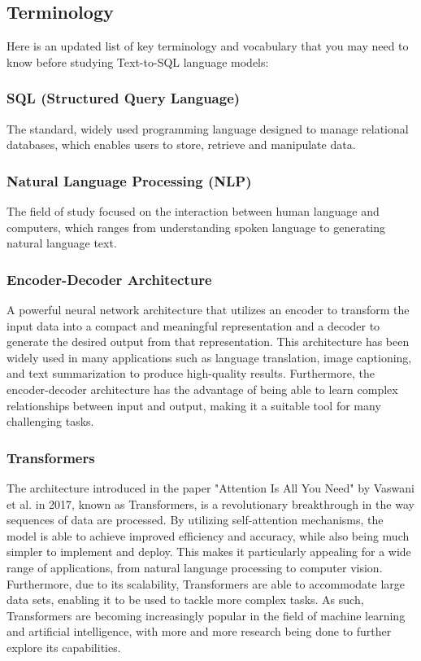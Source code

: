 \subsection{Terminology}

Here is an updated list of key terminology and vocabulary that you may need to know before studying Text-to-SQL language models:

\subsubsection{SQL (Structured Query Language)} The standard, widely used programming language designed to manage relational databases, which enables users to store, retrieve and manipulate data.
\subsubsection{Natural Language Processing (NLP)} The field of study focused on the interaction between human language and computers, which ranges from understanding spoken language to generating natural language text.
\subsubsection{Encoder-Decoder Architecture} A powerful neural network architecture that utilizes an encoder to transform the input data into a compact and meaningful representation and a decoder to generate the desired output from that representation. This architecture has been widely used in many applications such as language translation, image captioning, and text summarization to produce high-quality results. Furthermore, the encoder-decoder architecture has the advantage of being able to learn complex relationships between input and output, making it a suitable tool for many challenging tasks.
\subsubsection{Transformers} The architecture introduced in the paper "Attention Is All You Need" by Vaswani et al. in 2017, known as Transformers, is a revolutionary breakthrough in the way sequences of data are processed. By utilizing self-attention mechanisms, the model is able to achieve improved efficiency and accuracy, while also being much simpler to implement and deploy. This makes it particularly appealing for a wide range of applications, from natural language processing to computer vision. Furthermore, due to its scalability, Transformers are able to accommodate large data sets, enabling it to be used to tackle more complex tasks. As such, Transformers are becoming increasingly popular in the field of machine learning and artificial intelligence, with more and more research being done to further explore its capabilities.
